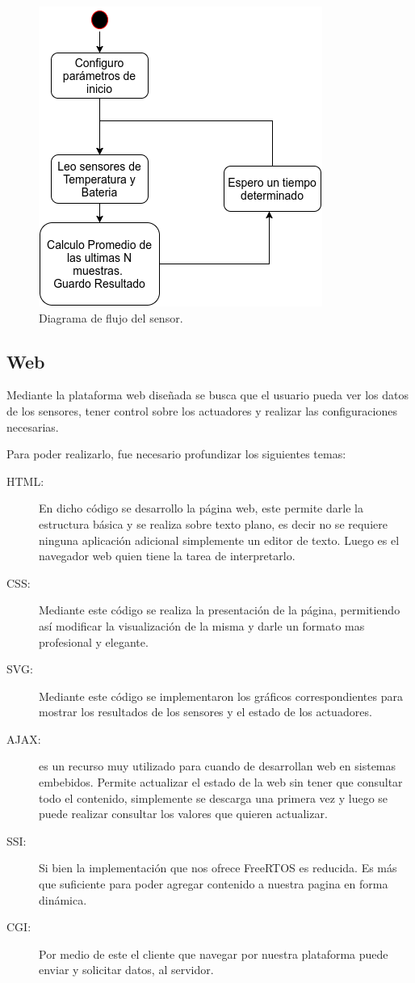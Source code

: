 \begin{figure}[!hp]
  \centering
  \includegraphics[scale=.5]{./Figures/sensor_task.png}
  \caption{Diagrama de flujo del sensor.}
  \label{fig:sensor_task}
\end{figure}

\subsection{Web}
Mediante la plataforma web diseñada se busca que el usuario pueda ver los datos de los sensores, tener control sobre los actuadores y realizar las configuraciones necesarias. 

Para poder realizarlo, fue necesario profundizar los siguientes temas:
\begin{description}
    \item[HTML:] En dicho código se desarrollo la página web, este permite darle la estructura básica y se realiza sobre texto plano, es decir no se requiere ninguna aplicación adicional simplemente un editor de texto. Luego es el navegador web quien tiene la tarea de interpretarlo. 
    \item[CSS:] Mediante este código se realiza la presentación de la página, permitiendo así modificar la visualización de la misma y darle un formato mas profesional y elegante.
    \item[SVG:] Mediante este código se implementaron los gráficos correspondientes para mostrar los resultados de los sensores y el estado de los actuadores.
    \item[AJAX:] es un recurso muy utilizado para cuando de desarrollan web en sistemas embebidos. Permite actualizar el estado de la web sin tener que consultar todo el contenido, simplemente se descarga una primera vez y luego se puede realizar consultar los valores que quieren actualizar. 
    \item[SSI:] Si bien la implementación que nos ofrece FreeRTOS es reducida. Es más que suficiente para poder agregar contenido a nuestra pagina en forma dinámica.
    \item[CGI:] Por medio de este el cliente que navegar por nuestra plataforma puede enviar y solicitar datos, al servidor.
\end{description}


